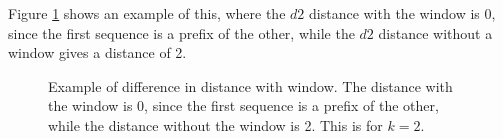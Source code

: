 Figure \ref{fig:d2_window_example} shows an example of this, where the $d2$
distance with the window is 0, since the first sequence is a prefix of the
other, while the $d2$ distance without a window gives a distance of 2.

\begin{figure}[H]
\centering
{}
\caption{Example of difference in distance with window. The distance with the
  window is 0, since the first sequence is a prefix of the other, while the
  distance without the window is 2. This is for $k=2$.}
\label{fig:d2_window_example}
\end{figure}
